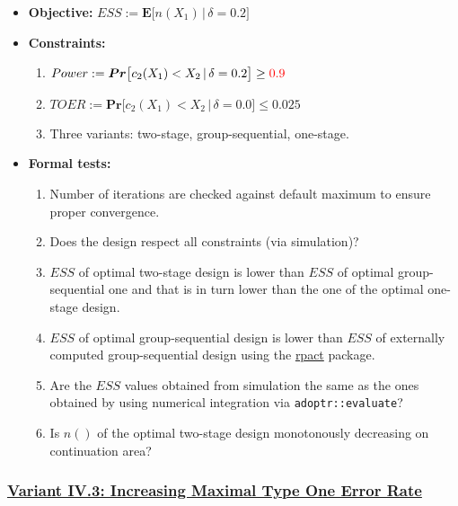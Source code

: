\documentclass[]{book}
\providecommand{\tightlist}{%
  \setlength{\itemsep}{0pt}\setlength{\parskip}{0pt}}
\begin{document}
\begin{itemize}
\tightlist
\item
  \textbf{Objective:} \(ESS := \boldsymbol{E}\big[n(X_1)\,|\,\delta=0.2\big]\)
\item
  \textbf{Constraints:}

  \begin{enumerate}
  \def\labelenumi{\arabic{enumi}.}
  \tightlist
  \item
    \(Power := \boldsymbol{Pr}\big[c_2(X_1) < X_2\,|\,\delta=0.2\big] \geq \color{red}{0.9}\)
  \item
    \(TOER := \boldsymbol{Pr}\big[c_2(X_1) < X_2\,|\,\delta=0.0\big] \leq 0.025\)
  \item
    Three variants: two-stage, group-sequential, one-stage.
  \end{enumerate}
\item
  \textbf{Formal tests:}

  \begin{enumerate}
  \def\labelenumi{\arabic{enumi}.}
  \tightlist
  \item
    Number of iterations are checked against default maximum to ensure proper
    convergence.
  \item
    Does the design respect all constraints (via simulation)?
  \item
    \(ESS\) of optimal two-stage design is lower than \(ESS\) of optimal
    group-sequential one and that is in turn lower than the one of the
    optimal one-stage design.
  \item
    \(ESS\) of optimal group-sequential design is lower than \(ESS\) of
    externally computed group-sequential design using the \href{https://rpact.org/}{rpact} package.
  \item
    Are the \(ESS\) values obtained from simulation the same as the ones
    obtained by using numerical integration via \texttt{adoptr::evaluate}?
  \item
    Is \(n()\) of the optimal two-stage design monotonously decreasing on
    continuation area?
  \end{enumerate}
\end{itemize}

\hypertarget{variant-iv.3-increasing-maximal-type-one-error-rate}{%
\subsubsection{\texorpdfstring{\protect\hyperlink{variantIV_3}{Variant IV.3: Increasing Maximal Type One Error Rate}}{Variant IV.3: Increasing Maximal Type One Error Rate}}\label{variant-iv.3-increasing-maximal-type-one-error-rate}}
\end{document}
